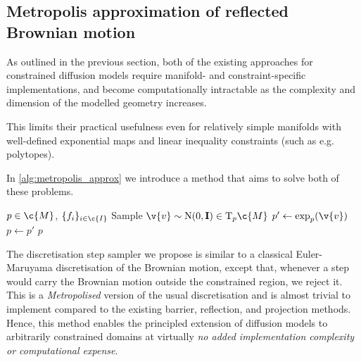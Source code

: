 \subsection{Metropolis approximation of reflected Brownian motion}
\label{sec:metropolis_scheme}
As outlined in the previous section, both of the existing approaches for constrained diffusion models require manifold- and constraint-specific implementations, and become computationally intractable as the complexity and dimension of the modelled geometry increases.

This limits their practical usefulness even for relatively simple manifolds with well-defined exponential maps and linear inequality constraints (such as e.g. polytopes).

In \cref{alg:metropolis_approx} we introduce a method that aims to solve both of these problems.
\begin{algorithm}[H]
	\caption[]{\protect{}}
	\label{alg:metropolis_approx}
	\begin{algorithmic}
		\Require \(p \in \c{M}\), \(\{f_i\}_{i \in \c{I}}\)
		\State Sample \(\v{v} \sim \mathrm{N}(0,\m{I}) \in \mathrm{T}_p\c{M}\)
		\State \(p' \gets \exp_{p}(\v{v})\)
		\State \(p\gets p'\)
		\EndIf
		\Return \(p\)
	\end{algorithmic}
\end{algorithm}
The discretisation step sampler we propose is similar to a classical Euler-Maruyama discretisation of the Brownian motion, except that, whenever a step would carry the Brownian motion outside the constrained region, we reject it.
This is a \emph{Metropolised} version of the usual discretisation and is almost trivial to implement compared to the existing barrier, reflection, and projection methods.
Hence, this method enables the principled extension of diffusion models to arbitrarily constrained domains at virtually \emph{no added implementation complexity or computational expense}.

